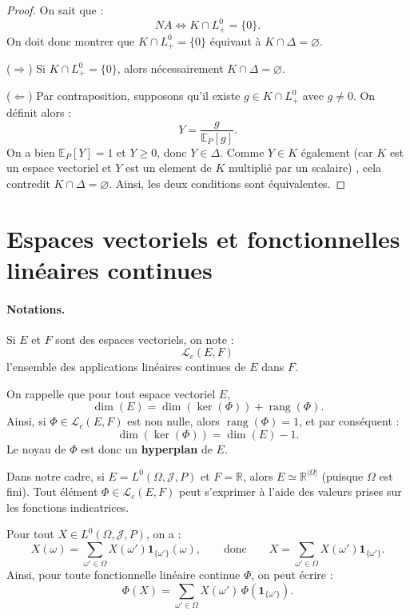 \begin{proof}
On sait que :
\[
NA \Longleftrightarrow K \cap L_+^0 = \{0\}.
\]
On doit donc montrer que $K \cap L_+^0 = \{0\}$ équivaut à $K \cap \Delta = \varnothing$.

\medskip
\noindent
($\Rightarrow$)  
Si $K \cap L_+^0 = \{0\}$, alors nécessairement $K \cap \Delta = \varnothing$.

\medskip
\noindent
($\Leftarrow$)  
Par contraposition, supposons qu'il existe $g \in K \cap L_+^0$ avec $g \neq 0$.  
On définit alors :
\[
Y = \frac{g}{\mathbb{E}_P[g]}.
\]
On a bien $\mathbb{E}_P[Y] = 1$ et $Y \ge 0$, donc $Y \in \Delta$.  
Comme $Y \in K$ également (car $K$ est un espace vectoriel et $Y$ est un element de $K$ multiplié par un scalaire)  , cela contredit $K \cap \Delta = \varnothing$.  
Ainsi, les deux conditions sont équivalentes.
\end{proof}

\section{Espaces vectoriels et fonctionnelles linéaires continues}

\paragraph{Notations.}
Si $E$ et $F$ sont des espaces vectoriels, on note :
\[
\mathcal{L}_c(E,F)
\]
l'ensemble des applications linéaires continues de $E$ dans $F$.

\medskip
\noindent
On rappelle que pour tout espace vectoriel $E$, 
\[
\dim(E) = \dim(\ker(\Phi)) + \operatorname{rang}(\Phi).
\]
Ainsi, si $\Phi \in \mathcal{L}_c(E,F)$ est non nulle, alors $\operatorname{rang}(\Phi)=1$, et par conséquent :
\[
\dim(\ker(\Phi)) = \dim(E) - 1.
\]
Le noyau de $\Phi$ est donc un \textbf{hyperplan} de $E$.

\medskip
\noindent
Dans notre cadre, si $E = L^0(\Omega, \mathcal{J}, P)$ et $F = \mathbb{R}$, alors $E \simeq \mathbb{R}^{|\Omega|}$ (puisque $\Omega$ est fini).  
Tout élément $\Phi \in \mathcal{L}_c(E,F)$ peut s'exprimer à l'aide des valeurs prises sur les fonctions indicatrices.

Pour tout $X \in L^0(\Omega, \mathcal{J}, P)$, on a :
\[
X(\omega) = \sum_{\omega' \in \Omega} X(\omega') \mathbf{1}_{\{\omega'\}}(\omega),
\qquad \text{donc} \qquad
X = \sum_{\omega' \in \Omega} X(\omega') \mathbf{1}_{\{\omega'\}}.
\]
Ainsi, pour toute fonctionnelle linéaire continue $\Phi$, on peut écrire :
\[
\Phi(X) = \sum_{\omega' \in \Omega} X(\omega') \, \Phi(\mathbf{1}_{\{\omega'\}}).
\]

